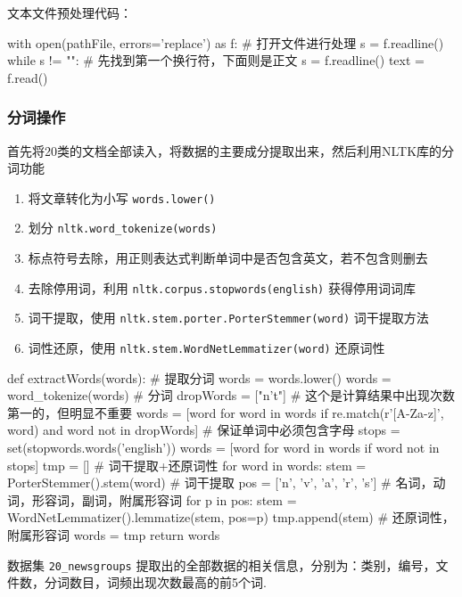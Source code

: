 \documentclass[12pt, a4paper, oneside]{ctexart}
\numberwithin{equation}{section}  %
\begin{document}
文本文件预处理代码：
\begin{pythoncode}
with open(pathFile, errors='replace') as f:  # 打开文件进行处理
    s = f.readline()
    while s != "\n":  # 先找到第一个换行符，下面则是正文
        s = f.readline()
        text = f.read()    
\end{pythoncode}

\subsubsection{分词操作}

首先将20类的文档全部读入，将数据的主要成分提取出来，然后利用NLTK库的分词功能

\begin{enumerate}
\item
  将文章转化为小写 \texttt{words.lower()}
\item
  划分 \texttt{nltk.word\_tokenize(words)}
\item
  标点符号去除，用正则表达式判断单词中是否包含英文，若不包含则删去
\item
  去除停用词，利用
  \texttt{nltk.corpus.stopwords(\textquotesingle{}english\textquotesingle{})}
  获得停用词词库
\item
  词干提取，使用 \texttt{nltk.stem.porter.PorterStemmer(word)}
  词干提取方法
\item
  词性还原，使用 \texttt{nltk.stem.WordNetLemmatizer(word)} 还原词性
\end{enumerate}
\begin{pythoncode}
def extractWords(words):  # 提取分词
    words = words.lower()
    words = word_tokenize(words)  # 分词
    dropWords = ["n't"]  # 这个是计算结果中出现次数第一的，但明显不重要
    words = [word for word in words if re.match(r'[A-Za-z]', word) and word not in dropWords]  # 保证单词中必须包含字母
    stops = set(stopwords.words('english'))
    words = [word for word in words if word not in stops]
    tmp = []  # 词干提取+还原词性
    for word in words:
        stem = PorterStemmer().stem(word)  # 词干提取
        pos = ['n', 'v', 'a', 'r', 's']  # 名词，动词，形容词，副词，附属形容词
        for p in pos:
            stem = WordNetLemmatizer().lemmatize(stem, pos=p)
        tmp.append(stem)  # 还原词性，附属形容词
    words = tmp
    return words
\end{pythoncode}
数据集 \texttt{20\_newsgroups}
提取出的全部数据的相关信息，分别为：类别，编号，文件数，分词数目，词频出现次数最高的前5个词.
\end{document}
